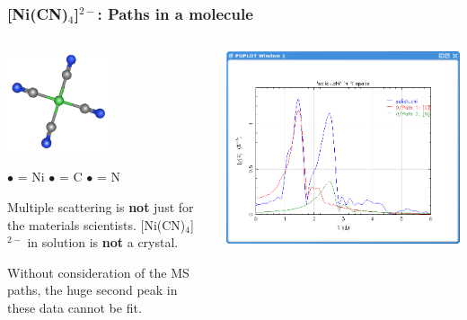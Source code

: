 \begin{frame}
  \frametitle{[Ni(CN)$_4$]$^{2-}$: Paths in a molecule}
  \begin{columns}
    \begin{column}{6cm}
      \begin{center}
        \includegraphics[width=3cm]{images/NiCN/nicn}

        {\color{Green4}$\bullet$} = Ni\quad
        {\color{Gray0}$\bullet$} = C\quad
        {\color{Blue2}$\bullet$} = N
      \end{center}
      Multiple scattering is \textbf{not} just for the materials
      scientists.  [Ni(CN)$_4$]$^{2-}$ in solution is \textbf{not} a
      crystal.

      Without consideration of the MS paths, the huge second peak in
      these data cannot be fit.
    \end{column}
    \begin{column}{4cm}
      \includegraphics[width=\linewidth]{images/NiCN/ss}


\end{column}
\end{columns}
\end{frame}
